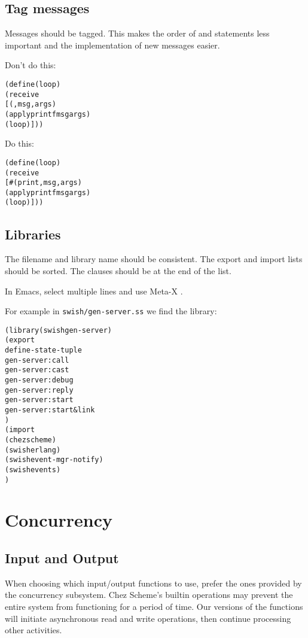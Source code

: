 \documentclass[letterpaper,11pt,twoside,final]{article}
\begin{document}
\subsection* {Tag messages}

Messages should be tagged. This makes the order of 
and  statements less important and the implementation of
new messages easier.

Don't do this:
\antipar
\begin{alltt}
(define (loop)
  (receive
   [(,msg ,args)
    (apply printf msg args)
    (loop)]))
\end{alltt}

Do this:
\antipar
\begin{alltt}
(define (loop)
  (receive
   [\#(print ,msg ,args)
    (apply printf msg args)
    (loop)]))
\end{alltt}

\subsection* {Libraries}

The filename and library name should be consistent. The export and
import lists should be sorted. The  clauses should be
at the end of the  list.

In Emacs, select multiple lines and use Meta-X .

For example in \texttt{swish/gen-server.ss} we find the
 library: \antipar
\begin{alltt}
(library (swish gen-server)
  (export
   define-state-tuple
   gen-server:call
   gen-server:cast
   gen-server:debug
   gen-server:reply
   gen-server:start
   gen-server:start&link
   )
  (import
   (chezscheme)
   (swish erlang)
   (swish event-mgr-notify)
   (swish events)
   )
\end{alltt}

\section* {Concurrency}

\subsection* {Input and Output}

When choosing which input/output functions to use, prefer the ones
provided by the concurrency subsystem. Chez Scheme's builtin
operations may prevent the entire system from functioning for a period
of time. Our versions of the functions will initiate asynchronous read
and write operations, then continue processing other activities.
\end{document}

